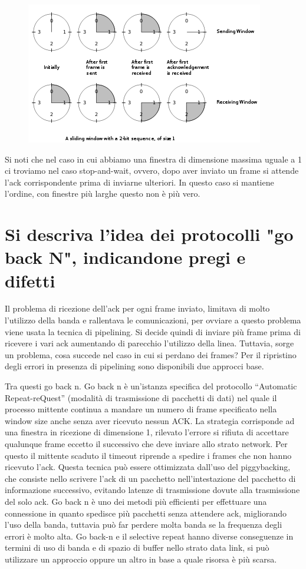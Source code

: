 \begin{figure}[H]
\centering
\includegraphics[scale=1]{res/img/19_SlidingWindow.png}
\end{figure}
 
Si noti che nel caso in cui abbiamo una finestra di dimensione massima uguale a 1 ci troviamo nel caso stop-and-wait, ovvero, dopo aver inviato un frame si attende l’ack corrispondente prima di inviarne ulteriori. In questo caso si mantiene l’ordine, con finestre più larghe questo non è più vero.

\section{Si descriva l'idea dei protocolli "go back N", indicandone pregi e difetti}

Il problema di ricezione dell’ack per ogni frame inviato, limitava di molto l’utilizzo della banda e rallentava le comunicazioni, per ovviare a questo problema viene usata la tecnica di pipelining. Si decide quindi di inviare più frame prima di ricevere i vari ack aumentando di parecchio l’utilizzo della linea. Tuttavia, sorge un problema, cosa succede nel caso in cui si perdano dei frames? Per il ripristino degli errori in presenza di pipelining sono disponibili due approcci base.

Tra questi go back n. Go back n è un’istanza specifica del protocollo “Automatic Repeat-reQuest” (modalità di trasmissione di pacchetti di dati) nel quale il processo mittente continua a mandare un numero di frame specificato nella window size anche senza aver ricevuto nessun ACK.
La strategia corrisponde ad una finestra in ricezione di dimensione 1, rilevato l’errore si rifiuta di accettare qualunque frame eccetto il successivo che deve inviare allo strato network. Per questo il mittente scaduto il timeout riprende a spedire i frames che non hanno ricevuto l’ack.
Questa tecnica può essere ottimizzata dall’uso del piggybacking, che consiste nello scrivere l’ack di un pacchetto nell’intestazione del pacchetto di informazione successivo, evitando latenze di trasmissione dovute alla trasmissione del solo ack.
Go back n è uno dei metodi più efficienti per effettuare una connessione in quanto spedisce più pacchetti senza attendere ack, migliorando l’uso della banda, tuttavia può far perdere molta banda se la frequenza degli errori è molto alta.
Go back-n e il selective repeat hanno diverse conseguenze in termini di uso di banda e di spazio di buffer nello strato data link, si può utilizzare un approccio oppure un altro in base a quale risorsa è più scarsa.

